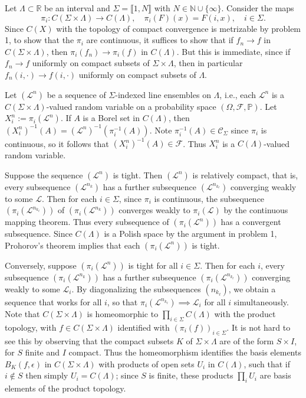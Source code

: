 \documentclass[12pt]{article}
\begin{document}
		Let $\Lambda\subset\mathbb{R}$ be an interval and $\Sigma = \llbracket 1, N\rrbracket$ with $N\in\mathbb{N}\cup\{\infty\}$. Consider the maps 
		\[
		\pi_i : C(\Sigma\times\Lambda) \to C(\Lambda), \quad \pi_i(F)(x) = F(i,x), \quad i\in\Sigma.
		\]
		Since $C(X)$ with the topology of compact convergence is metrizable by problem 1, to show that the $\pi_i$ are continuous, it suffices to show that if $f_n\to f$ in $C(\Sigma\times\Lambda)$, then $\pi_i(f_n)\to \pi_i(f)$ in $C(\Lambda)$. But this is immediate, since if $f_n\to f$ uniformly on compact subsets of $\Sigma\times\Lambda$, then in particular $f_n(i,\cdot)\to f(i,\cdot)$ uniformly on compact subsets of $\Lambda$.
		
		Let $(\mathcal{L}^n)$ be a sequence of $\Sigma$-indexed line ensembles on $\Lambda$, i.e., each $\mathcal{L}^n$ is a $C(\Sigma\times\Lambda)$-valued random variable on a probability space $(\Omega,\mathcal{F},\mathbb{P})$. Let $X_i^n := \pi_i(\mathcal{L}^n)$. If $A$ is a Borel set in $C(\Lambda)$, then $(X_i^n)^{-1}(A) = (\mathcal{L}^n)^{-1}(\pi_i^{-1}(A))$. Note $\pi_i^{-1}(A)\in\mathcal{C}_\Sigma$ since $\pi_i$ is continuous, so it follows that $(X_i^n)^{-1}(A)\in\mathcal{F}$. Thus $X_i^n$ is a $C(\Lambda)$-valued random variable.
		
		Suppose the sequence $(\mathcal{L}^n)$ is tight. Then $(\mathcal{L}^n)$ is relatively compact, that is, every subsequence $(\mathcal{L}^{n_k})$ has a further subsequence $(\mathcal{L}^{n_{k_\ell}})$ converging weakly to some $\mathcal{L}$. Then for each $i\in\Sigma$, since $\pi_i$ is continuous, the subsequence $(\pi_i(\mathcal{L}^{n_{k_\ell}}))$ of $(\pi_i(\mathcal{L}^{n_k}))$ converges weakly to $\pi_i(\mathcal{L})$ by the continuous mapping theorem. Thus every subsequence of $(\pi_i(\mathcal{L}^n))$ has a convergent subsequence. Since $C(\Lambda)$ is a Polish space by the argument in problem 1, Prohorov's theorem implies that each $(\pi_i(\mathcal{L}^n))$ is tight.
		
		Conversely, suppose $(\pi_i(\mathcal{L}^n))$ is tight for all $i\in\Sigma$. Then for each $i$, every subsequence $(\pi_i(\mathcal{L}^{n_k}))$ has a further subsequence $(\pi_i(\mathcal{L}^{n_{k_\ell}}))$ converging weakly to some $\mathcal{L}_i$. By diagonalizing the subsequences $(n_{k_\ell})$, we obtain a sequence that works for all $i$, so that $\pi_i(\mathcal{L}^{n_{k_\ell}})\implies \mathcal{L}_i$ for all $i$ simultaneously. Note that $C(\Sigma\times\Lambda)$ is homeomorphic to $\prod_{i\in\Sigma} C(\Lambda)$ with the product topology, with $f\in C(\Sigma\times\Lambda)$ identified with $(\pi_i(f))_{i\in\Sigma}$. It is not hard to see this by observing that the compact subsets $K$ of $\Sigma\times\Lambda$ are of the form $S\times I$, for $S$ finite and $I$ compact. Thus the homeomorphism identifies the basis elements $B_K(f,\epsilon)$ in $C(\Sigma\times\Lambda)$ with products of open sets $U_i$ in $C(\Lambda)$, such that if $i\notin S$ then simply $U_i = C(\Lambda)$; since $S$ is finite, these products $\prod_i U_i$ are basis elements of the product topology.
				 
\end{document}
